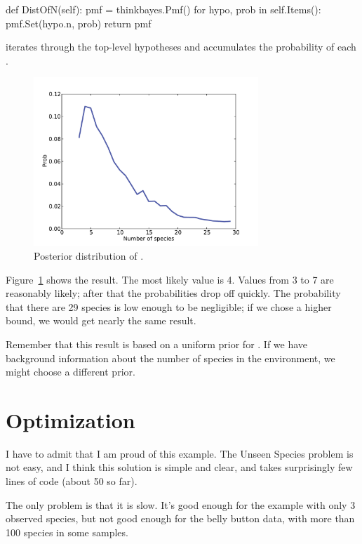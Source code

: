\documentclass[12pt]{book}
\theoremstyle{exercise}
\begin{document}
\begin{code}
    def DistOfN(self):
        pmf = thinkbayes.Pmf()
        for hypo, prob in self.Items():
            pmf.Set(hypo.n, prob)
        return pmf
\end{code}

 iterates
through the top-level hypotheses and accumulates the probability
of each .

\begin{figure}
\centerline{\includegraphics[height=2.5in]{figs/species2.pdf}}
\caption{Posterior distribution of .}
\label{fig.species2}
\end{figure}

Figure~\ref{fig.species2} shows the result.  The most likely value is 4.
Values from 3 to 7 are reasonably likely; after that the probabilities
drop off quickly.  The probability that there are 29 species is
low enough to be negligible; if we chose a higher bound, 
we would get nearly the same result.

Remember that this result is based on a uniform prior for .  If
we have background information about the number of species in the
environment, we might choose a different prior.  


\section{Optimization}

I have to admit that I am proud of this example.  The Unseen Species
problem is not easy, and I think this solution is simple and clear,
and takes surprisingly few lines of code (about 50 so far).

The only problem is that it is slow.  It's good enough for the example
with only 3 observed species, but not good enough for the belly button
data, with more than 100 species in some samples.
\end{document}
